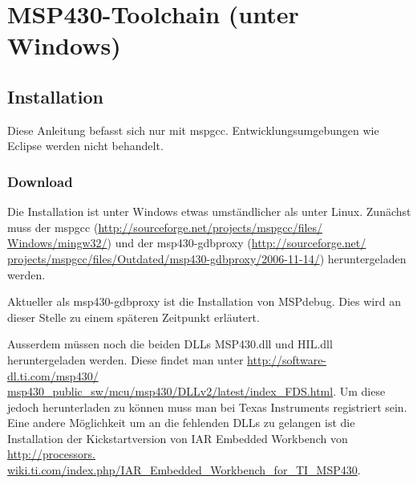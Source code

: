 \section{MSP430-Toolchain (unter Windows)}
\subsection{Installation}
Diese Anleitung befasst sich nur mit mspgcc. Entwicklungsumgebungen wie Eclipse 
werden nicht behandelt. 
\subsubsection{Download}
Die Installation ist unter Windows etwas umständlicher als unter Linux. 
Zunächst muss der mspgcc (\url{http://sourceforge.net/projects/mspgcc/files/
Windows/mingw32/}) und der msp430-gdbproxy (\url{http://sourceforge.net/
projects/mspgcc/files/Outdated/msp430-gdbproxy/2006-11-14/}) heruntergeladen 
werden. 

Aktueller als msp430-gdbproxy ist die Installation von MSPdebug. Dies wird an 
dieser Stelle zu einem späteren Zeitpunkt erläutert. 

Ausserdem müssen noch die beiden DLLs MSP430.dll und HIL.dll heruntergeladen 
werden. Diese findet man unter \url{http://software-dl.ti.com/msp430/
msp430_public_sw/mcu/msp430/DLLv2/latest/index_FDS.html}. Um diese jedoch 
herunterladen zu können muss man bei Texas Instruments registriert sein. Eine 
andere Möglichkeit um an die fehlenden DLLs zu gelangen ist die Installation 
der Kickstartversion von IAR Embedded Workbench von \url{http://processors.
wiki.ti.com/index.php/IAR_Embedded_Workbench_for_TI_MSP430}. 




